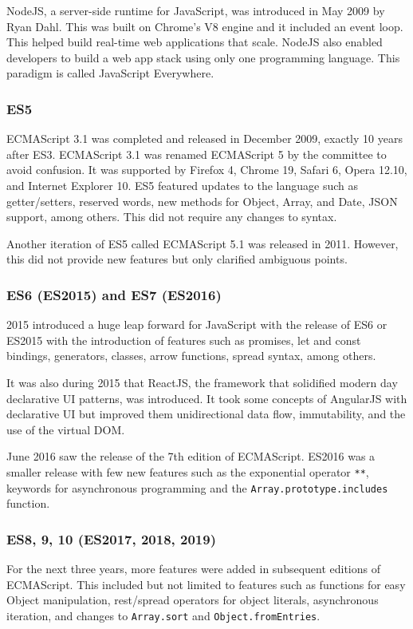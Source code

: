 \documentclass{article}
\newcommand{\jsin}[1]{\texttt{#1}}
\begin{document}
    NodeJS, a server-side runtime for JavaScript, was introduced in May 2009 by
    Ryan Dahl. This was built on Chrome’s V8 engine and it included an event
    loop. This helped build real-time web applications that scale. NodeJS also
    enabled developers to build a web app stack using only one programming
    language. This paradigm is called JavaScript Everywhere.

    \subsubsection{ES5}
    ECMAScript 3.1 was completed and released in December 2009, exactly 10 years
    after ES3. ECMAScript 3.1 was renamed ECMAScript 5 by the committee to avoid
    confusion. It was supported by Firefox 4, Chrome 19, Safari 6, Opera 12.10,
    and Internet Explorer 10. ES5 featured updates to the language such as
    getter/setters, reserved words, new methods for Object, Array, and Date,
    JSON support, among others. This did not require any changes to syntax.

    Another iteration of ES5 called ECMAScript 5.1 was released in 2011.
    However, this did not provide new features but only clarified ambiguous
    points.

    \subsubsection{ES6 (ES2015) and ES7 (ES2016)}
    2015 introduced a huge leap forward for JavaScript with the release of ES6
    or ES2015 with the introduction of features such as promises, let and const
    bindings, generators, classes, arrow functions, spread syntax, among others.

    It was also during 2015 that ReactJS, the framework that solidified modern
    day declarative UI patterns, was introduced. It took some concepts of
    AngularJS with declarative UI but improved them unidirectional data flow,
    immutability, and the use of the virtual DOM.\@

    June 2016 saw the release of the 7th edition of ECMAScript. ES2016
    was a smaller release with few new features such as the
    exponential operator \jsin{**}, keywords for asynchronous programming and the
    \jsin{Array.prototype.includes} function.

    \subsubsection{ES8, 9, 10 (ES2017, 2018, 2019)}
    For the next three years, more features were added in subsequent editions of
    ECMAScript. This included but not limited to features such as functions for
    easy Object manipulation, rest/spread operators for object literals,
    asynchronous iteration, and changes to \jsin{Array.sort} and 
    \jsin{Object.fromEntries}.
\end{document}
